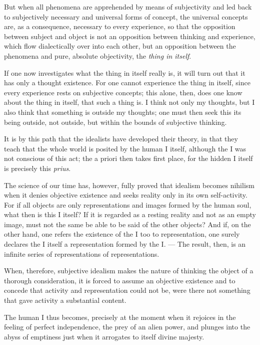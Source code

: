 \documentclass[12pt]{book}
\newcommand{\opage}[1]{\marginnote{\footnotesize\textit{[#1]}}}
\begin{document}
But when all phenomena are apprehended by means of subjectivity and led back to
subjectively necessary and universal forms of concept, the universal concepts
are, as a consequence, necessary to every experience, so that the opposition
between subject and object is not an opposition between thinking and
experience, which flow dialectically over into each other, but an opposition
between the phenomena and pure, absolute objectivity, the \emph{thing in
itself}.

If one now investigates what the thing in itself really is, it will turn out
that it has only a thought existence. For one cannot experience the thing in
itself, since every experience rests on subjective concepts; this alone, then,
does one know about the thing in itself, that such a thing is. I think not only
my thoughts, but I also think that something is outside my thoughts; one must
then seek this its being outside, not outside, but within the bounds of
subjective thinking.

It is by this path that the idealists have developed their theory, in that they
teach that the whole world is posited by the human I itself, although the I
was not conscious of this act; the a priori then takes first place, for the
hidden I itself is precisely this \textit{prius}.

The science of our time has, however, fully proved that idealism becomes
nihilism when it denies objective existence and seeks reality only in its own
self-activity.
\opage{4} For if all objects are only representations and images formed by the
human soul, what then is this I itself? If it is regarded as a resting reality
and not as an empty image, must not the same be able to be said of the other
objects? And if, on the other hand, one refers the existence of the I too to
representation, one surely declares the I itself a representation formed by
the I. --- The result, then, is an infinite series of representations of
representations.

When, therefore, subjective idealism makes the nature of thinking the object of
a thorough consideration, it is forced to assume an objective existence and to
concede that activity and representation could not be, were there not
something that gave activity a substantial content.

The human I thus becomes, precisely at the moment when it rejoices in the
feeling of perfect independence, the prey of an alien power, and plunges into
the abyss of emptiness just when it arrogates to itself divine majesty.
\end{document}
